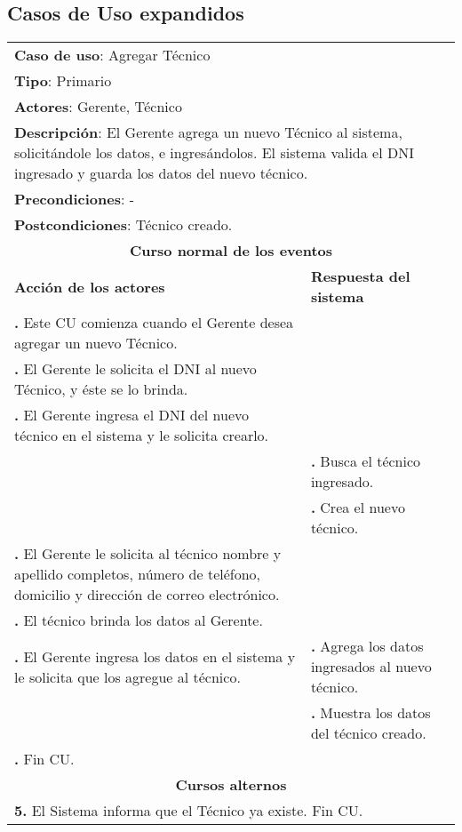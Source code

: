 \documentclass[12pt]{extarticle}
\begin{document}
    \subsection{Casos de Uso expandidos}

    \newcommand\inc{\stepcounter{step}\textbf{\thestep. }}
    \newcommand\resetinc{\setcounter{step}{0}}

    \newcommand\raya{\noindent\rule{169mm}{0.8mm}\\}

\begin{longtable}{ |p{8cm}|p{8cm}| }
    \hline
    \multicolumn{2}{|p{16cm}|}{\textbf{Caso de uso}: Agregar Técnico}\\
    \multicolumn{2}{|p{16cm}|}{\textbf{Tipo}: Primario}\\
    \multicolumn{2}{|p{16cm}|}{\textbf{Actores}: Gerente, Técnico}\\
    \multicolumn{2}{|p{16cm}|}{\textbf{Descripción}: El Gerente agrega un nuevo Técnico al sistema, solicitándole los datos, e ingresándolos. El sistema valida el DNI ingresado y guarda los datos del nuevo técnico. }\\
    \multicolumn{2}{|p{16cm}|}{\textbf{Precondiciones}: - }\\
    \multicolumn{2}{|p{16cm}|}{\textbf{Postcondiciones}: Técnico creado.}\\
    \hline
    \multicolumn{2}{|c|}{\textbf{Curso normal de los eventos}}\\
    \hline
    \textbf{Acción de los actores} & \textbf{Respuesta del sistema}\\
    \hline
        \inc Este CU comienza cuando el Gerente desea agregar un nuevo Técnico.& \\
        \hline
        \inc  El Gerente le solicita el DNI al nuevo Técnico, y éste se lo brinda.&\\
        \hline
        \inc El Gerente ingresa el DNI del nuevo técnico en el sistema y le solicita crearlo.& \\
        \hline
        & \inc Busca el técnico ingresado.\\
        \hline
        & \inc Crea el nuevo técnico.\\
        \hline
        \inc El Gerente le solicita al técnico nombre y apellido completos, número de teléfono, domicilio y dirección de correo electrónico.& \\
        \hline
        \inc El técnico brinda los datos al Gerente.&\\
        \hline
        \inc El Gerente ingresa los datos en el sistema y le solicita que los agregue al técnico.
        \hline
        & \inc Agrega los datos ingresados al nuevo técnico. \\
        \hline
        & \inc Muestra los datos del técnico creado. \\
        \hline
        \inc Fin CU. & \\
    \hline
    \multicolumn{2}{|c|}{\textbf{Cursos alternos}}\\
    \hline
    \multicolumn{2}{|p{16cm}|}{\textbf{5. }El Sistema informa que el Técnico ya existe. Fin CU.}\\
    \hline
\end{longtable}
\end{document}
